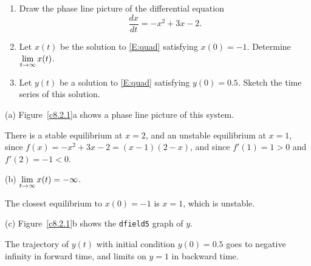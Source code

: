 \documentclass{ximera}
\begin{document}
\begin{exercise} \label{c8.2.1}
\begin{enumerate}
\item[(a)] Draw the phase line picture of the differential
equation 
\begin{equation}  \label{E:quad}
\frac{dx}{dt} = -x^2 +3x -2.
\end{equation}
\item[(b)] Let $x(t)$ be the solution to \eqref{E:quad} satisfying
$x(0)=-1$.  Determine $\displaystyle\lim_{t\to\infty} x(t)$. 
\item[(c)] Let $y(t)$ be a solution to \eqref{E:quad} satisfying
$y(0)=0.5$. Sketch the time series of this solution.
\end{enumerate}

\begin{solution}

(a) \ans Figure~\ref{c8.2.1}a shows a phase line picture
of this system.

\soln There is a stable equilibrium at $x = 2$, and an unstable
equilibrium at $x = 1$, since $f(x) = -x^2 + 3x - 2 = (x - 1)(2 - x)$,
and since $f'(1) = 1 > 0$ and $f'(2) = -1 < 0$.

(b) \ans $\displaystyle\lim_{t \to \infty} x(t) = -\infty$.

\soln The closest equilibrium to $x(0) = -1$ is $x = 1$, which is
unstable. 

(c) \ans Figure~\ref{c8.2.1}b shows the {\tt dfield5} graph of $y$.

\soln The trajectory of $y(t)$ with initial condition $y(0) = 0.5$ goes
to negative infinity in forward time, and limits on $y = 1$ in
backward time.

\begin{figure}[htb]
                       \centerline{%
                       }
\end{figure}



\end{solution}
\end{exercise}
\end{document}
